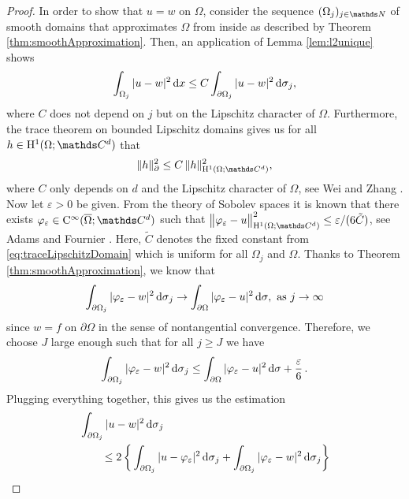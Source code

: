 \begin{proof}
  In order to show that $u = w$ on $\Omega$, consider the sequence $(\Omega_j)_{j \in \N}$ of smooth domains that approximates $\Omega$ from inside as described by Theorem \ref{thm:smoothApproximation}.
  Then, an application of Lemma \ref{lem:l2unique} shows
  \begin{align}
    \label{eq:reverseTraceUnique}
    \int_{\Omega_j} |u - w|^2 \, {\operatorname{d}\!{x}} \leq C \int_{\partial\Omega_j} |u - w|^2 \, {\operatorname{d}\!{\sigma}}_j,
  \end{align}
  where $C$ does not depend on $j$ but on the Lipschitz character of $\Omega$.
  Furthermore, the trace theorem on bounded Lipschitz domains gives us for all $h \in \HH^1(\Omega; \C^d)$ that
  \begin{align}
    \label{eq:traceLipschitzDomain}
     \|h\|_\partial^2 \leq C\, \|h\|_{\HH^1(\Omega; \C^d)}^2,
  \end{align}
  where $C$ only depends on $d$ and the Lipschitz character of $\Omega$, see Wei and Zhang \cite[Lem. 2.2]{weiZhang}.
  Now let $\varepsilon > 0$ be given. 
  From the theory of Sobolev spaces it is known that there exists $\varphi_\varepsilon \in \CC^\infty(\overline\Omega; \C^d)$ such that $\big\|\varphi_\varepsilon - u\big\|_{\HH^1(\Omega; \C^d)}^2 \leq {\varepsilon}/({6 \tilde C})$, see Adams and Fournier \cite[Thm. 3.18]{adams}.
  Here, $\tilde C$ denotes the fixed constant from \eqref{eq:traceLipschitzDomain} which is uniform for all $\Omega_j$ and $\Omega$.
  Thanks to Theorem \ref{thm:smoothApproximation}, we know that 
  \begin{align*}
    \int_{\partial\Omega_j} |\varphi_\varepsilon - w|^2 \, {\operatorname{d}\!{\sigma}}_j \to \int_{\partial\Omega} |\varphi_\varepsilon - u|^2 \, {\operatorname{d}\!{\sigma}}, \text{ as } j \to \infty
  \end{align*}
  since $w = f$ on $\partial\Omega$ in the sense of nontangential convergence.
  Therefore, we choose $J$ large enough such that for all $j \geq J$ we have
  \begin{align*}
    \int_{\partial\Omega_j} |\varphi_\varepsilon - w|^2 \, {\operatorname{d}\!{\sigma}}_j \leq \int_{\partial\Omega} |\varphi_\varepsilon - u|^2 \, {\operatorname{d}\!{\sigma}} + \frac{\varepsilon}{6}\,.
  \end{align*}
  Plugging everything together, this gives us the estimation
  \begin{align*}
    &\int_{\partial\Omega_j} |u - w|^2 \d\sigma_j  \\
    &\qquad\leq 2 \, \bigg\{ \int_{\partial\Omega_j} |u - \varphi_\varepsilon |^2 \d\sigma_j + \int_{\partial\Omega_j} |\varphi_\varepsilon - w|^2 \d\sigma_j \bigg\}

\end{align*}
\end{proof}
